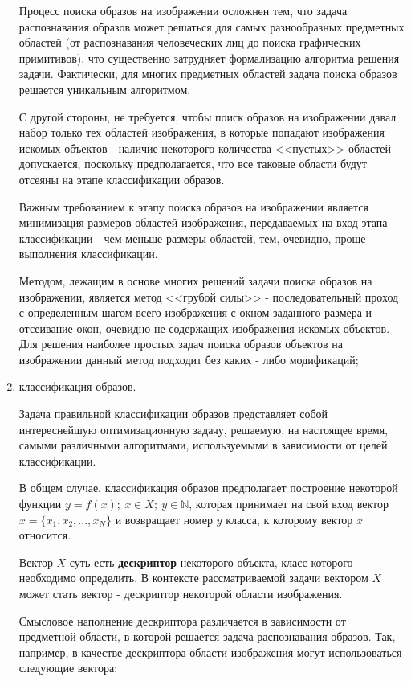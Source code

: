 \begin{enumerate}
	Процесс поиска образов на изображении осложнен тем, что задача распознавания образов может решаться для самых разнообразных предметных областей (от распознавания человеческих лиц до поиска графических примитивов), что существенно затрудняет формализацию алгоритма решения задачи. Фактически, для многих предметных областей задача поиска образов решается уникальным алгоритмом.

	С другой стороны, не требуется, чтобы поиск образов на изображении давал набор только тех областей изображения, в которые попадают изображения искомых объектов - наличие некоторого количества <<пустых>> областей допускается, поскольку предполагается, что все таковые области будут отсеяны на этапе классификации образов.

	Важным требованием к этапу поиска образов на изображении является минимизация размеров областей изображения, передаваемых на вход этапа классификации - чем меньше размеры областей, тем, очевидно, проще выполнения классификации.

	Методом, лежащим в основе многих решений задачи поиска образов на изображении, является метод <<грубой силы>> - последовательный проход с определенным шагом всего изображения с окном заданного размера и отсеивание окон, очевидно не содержащих изображения искомых объектов. Для решения наиболее простых задач поиска образов объектов на изображении данный метод подходит без каких - либо модификаций;

	\item классификация образов.

	Задача правильной классификации образов представляет собой интереснейшую оптимизационную задачу, решаемую, на настоящее время, самыми различными алгоритмами, используемыми в зависимости от целей классификации.
	
	В общем случае, классификация образов предполагает построение некоторой функции $y = f(x) ;~ x \in X ;~ y \in \mathbb{N}$, которая принимает на свой вход вектор $x = \{x_1, x_2, ..., x_N\}$ и возвращает номер $y$ класса, к которому вектор $x$ относится.

	Вектор $X$ суть есть {\bf дескриптор} некоторого объекта, класс которого необходимо определить. В контексте рассматриваемой задачи вектором $X$ может стать вектор - дескриптор некоторой области изображения.

	Смысловое наполнение дескриптора различается в зависимости от предметной области, в которой решается задача распознавания образов. Так, например, в качестве дескриптора области изображения могут использоваться следующие вектора:
	

\end{enumerate}
